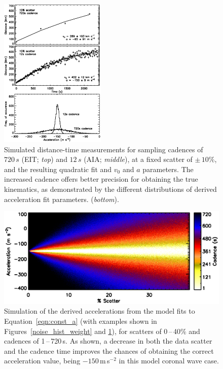 \documentclass[structabstract]{aa}
\begin{document}
\begin{figure}[!t]
\begin{center}
\includegraphics[width = 0.45\textwidth]{images/cad_hist_weight.eps}
\caption{Simulated distance-time measurements for sampling cadences of $720\,s$ (EIT; \emph{top}) and $12\,s$ (AIA; \emph{middle}), at a fixed scatter of $\pm\,10\%$, and the resulting quadratic fit and $v_0$ and $a$ parameters. The increased cadence offers better precision for obtaining the true kinematics, as demonstrated by the different distributions of derived acceleration fit parameters. (\emph{bottom}).}
\label{cad_hist_weight}
\end{center}
\end{figure}

\begin{figure}[!b]
\begin{center}
\includegraphics[scale=0.53, trim=20 10 0 20]{images/fig_noise_cad.eps}
\caption{Simulation of the derived accelerations from the model fits to Equation~\ref{eqn:const_a} (with examples shown in Figures~\ref{noise_hist_weight} and \ref{cad_hist_weight}), for scatters of 0\,--\,40\% and cadences of 1\,--\,720\,s. As shown, a decrease in both the data scatter and the cadence time improves the chances of obtaining the correct acceleration value, being $-150$\,m\,s$^{-2}$ in this model coronal wave case.}
\label{noise_test_image}
\end{center}
\end{figure}
\end{document}
